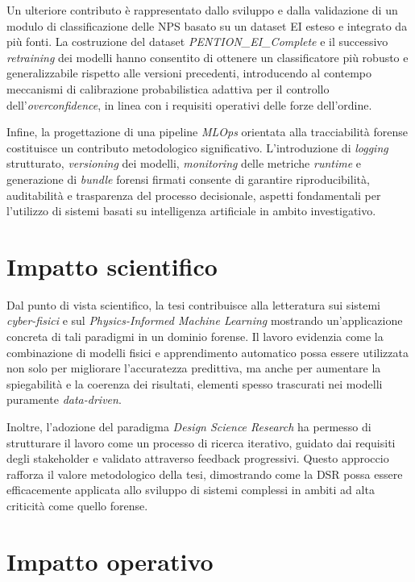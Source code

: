 Un ulteriore contributo è rappresentato dallo sviluppo e dalla validazione di un modulo di classificazione delle NPS basato su un dataset EI esteso e integrato da più fonti.
La costruzione del dataset \textit{PENTION\_EI\_Complete} e il successivo \textit{retraining} dei modelli hanno consentito di ottenere un classificatore più robusto e generalizzabile rispetto alle versioni precedenti, introducendo al contempo meccanismi di calibrazione probabilistica adattiva per il controllo dell’\textit{overconfidence}, in linea con i requisiti operativi delle forze dell’ordine.

Infine, la progettazione di una pipeline \textit{MLOps} orientata alla tracciabilità forense costituisce un contributo metodologico significativo.
L’introduzione di \textit{logging} strutturato, \textit{versioning} dei modelli, \textit{monitoring} delle metriche \textit{runtime} e generazione di \textit{bundle} forensi firmati consente di garantire riproducibilità, auditabilità e trasparenza del processo decisionale, aspetti fondamentali per l’utilizzo di sistemi basati su intelligenza artificiale in ambito investigativo.

\section{Impatto scientifico}

Dal punto di vista scientifico, la tesi contribuisce alla letteratura sui sistemi \textit{cyber-fisici} e sul \textit{Physics-Informed Machine Learning} mostrando un’applicazione concreta di tali paradigmi in un dominio forense.
Il lavoro evidenzia come la combinazione di modelli fisici e apprendimento automatico possa essere utilizzata non solo per migliorare l’accuratezza predittiva, ma anche per aumentare la spiegabilità e la coerenza dei risultati, elementi spesso trascurati nei modelli puramente \textit{data-driven}.

Inoltre, l’adozione del paradigma \textit{Design Science Research} ha permesso di strutturare il lavoro come un processo di ricerca iterativo, guidato dai requisiti degli stakeholder e validato attraverso feedback progressivi.
Questo approccio rafforza il valore metodologico della tesi, dimostrando come la DSR possa essere efficacemente applicata allo sviluppo di sistemi complessi in ambiti ad alta criticità come quello forense.

\section{Impatto operativo}

